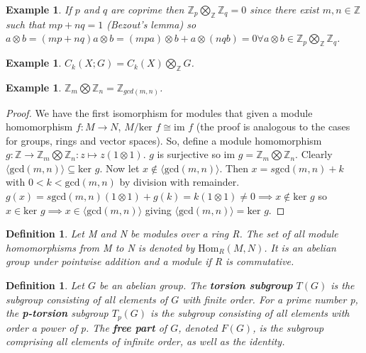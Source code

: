 \documentclass{article}
\newtheorem{definition}[theorem]{Definition}
\newtheorem{example}[theorem]{Example}
\begin{document}
\begin{example}
If $p$ and $q$ are coprime then $\mathbb{Z}_p\bigotimes_\mathbb{Z}\mathbb{Z}_q=0$ since there exist $m,n\in\mathbb{Z}$ such that $mp+nq=1$ (Bezout's lemma) so $a\otimes b=(mp+nq)a\otimes b=(mpa)\otimes b + a\otimes(nqb)=0\forall a\otimes b\in\mathbb{Z}_p\bigotimes_\mathbb{Z}\mathbb{Z}_q$.
\end{example}
\begin{example}
$C_k(X;G)=C_k(X)\bigotimes_\mathbb{Z}G$.
\end{example}

\begin{example}
$\mathbb{Z}_m\bigotimes\mathbb{Z}_n=\mathbb{Z}_{gcd(m,n)}$.
\end{example}
\begin{proof}
We have the first isomorphism for modules that given a module homomorphism $f:M\to N$, $M/\text{ker }f\cong\text{im }f$ (the proof is analogous to the cases for groups, rings and vector spaces).
So, define a module homomorphism $g\colon\mathbb{Z}\to\mathbb{Z}_m\bigotimes\mathbb{Z}_n:z\mapsto z(1\otimes 1)$. $g$ is surjective so $\text{im }g=\mathbb{Z}_m\bigotimes\mathbb{Z}_n$. Clearly $\langle\text{gcd}(m,n)\rangle\subseteq\text{ker }g$. Now let $x\notin \langle\text{gcd}(m,n)\rangle$. Then $x=s\text{gcd}(m,n)+k$ with $0<k<\text{gcd}(m,n)$ by division with remainder. $g(x)=s\text{gcd}(m,n)(1\otimes 1)+g(k)=k(1\otimes 1)\neq 0\implies x\notin\text{ker }g$ so $x\in\text{ker }g\implies x\in\langle\text{gcd}(m,n)\rangle$ giving $\langle\text{gcd}(m,n)\rangle=\text{ker }g$.
\end{proof}


\begin{definition}
Let M and N be modules over a ring R. The set of all module homomorphisms from M to N is denoted by $\text{Hom}_R(M,N)$. It is an abelian group under pointwise addition and a module if R is commutative.
\end{definition}

\begin{definition}
Let $G$ be an abelian group. The \textbf{torsion subgroup} $T(G)$ is the subgroup consisting of all elements of $G$ with finite order. For a prime number p, the \textbf{p-torsion} subgroup $T_p(G)$ is the subgroup consisting of all elements with order a power of p. The \textbf{free part} of $G$, denoted $F(G)$, is the subgroup comprising all elements of infinite order, as well as the identity.
\end{definition}
\end{document}
